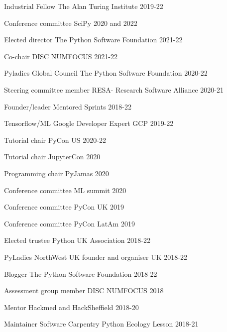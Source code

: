 


\begin{cvpress}

\cvpres
{Industrial Fellow}
{The Alan Turing Institute}
{2019-22}

\cvpres
{Conference committee}
{SciPy}
{2020 and 2022}

\cvpres
{Elected director}
{The Python Software Foundation}
{2021-22}

\cvpres
{Co-chair}
{DISC NUMFOCUS}
{2021-22}

\cvpres
{Pyladies Global Council}
{The Python Software Foundation}
{2020-22}

\cvpres
{Steering committee member}
{RESA- Research Software Alliance}
{2020-21}

\cvpres
{Founder/leader}
{Mentored Sprints}
{2018-22}

\cvpres
{Tensorflow/ML Google Developer Expert}
{GCP}
{2019-22}

\cvpres
{Tutorial chair}
{PyCon US}
{2020-22}

\cvpres
{Tutorial chair}
{JupyterCon}
{2020}

\cvpres
{Programming chair}
{PyJamas}
{2020}

\cvpres
{Conference committee}
{ML summit}
{2020}

\cvpres
{Conference committee}
{PyCon UK}
{2019}

\cvpres
{Conference committee}
{PyCon LatAm}
{2019}

\cvpres
{Elected trustee} %
{Python UK Association}
{2018-22}

\cvpres
{PyLadies NorthWest UK founder and organiser} %
{UK}
{2018-22}

\cvpres
{Blogger} %
{The Python Software Foundation}
{2018-22}

\cvpres
{Assessment group member}
{DISC NUMFOCUS}
{2018}

\cvpres
{Mentor}
{Hackmed and HackSheffield}
{2018-20}

\cvpres
{Maintainer} %
{Software Carpentry Python Ecology Lesson}
{2018-21}


\end{cvpress}
